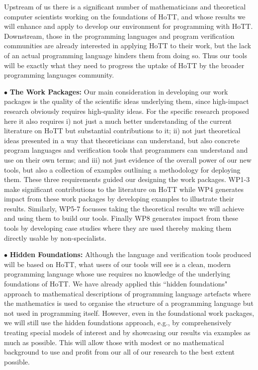 \documentclass[a4paper,11pt]{article}
\begin{document}
Upstream of us there is a significant number of mathematicians and
theoretical computer scientists working on the foundations of HoTT,
and whose results we will enhance and apply to develop our environment
for programming with HoTT. Downstream, those in the programming
languages and program verification communities are already interested
in applying HoTT to their work, but the lack of an actual programming
language hinders them from doing so. Thus our tools will be exactly
what they need to progress the uptake of HoTT by the broader
programming languages community. 

\vspace*{0.02in}

$\bullet$ {\bf The Work Packages:} Our main consideration in
developing our work packages is the quality of the scientific ideas
underlying them, since high-impact research obviously requires
high-quality ideas. For the specific research proposed here it also
requires i) not just a much better understanding of the current
literature on HoTT but substantial contributions to it; ii) not just
theoretical ideas presented in a way that theoreticians can
understand, but also concrete program languages and verification tools
that programmers can understand and use on their own terms; and iii)
not just evidence of the overall power of our new tools, but also a
collection of examples outlining a methodology for deploying them.
These three requirements guided our designing the work packages. WP1-3
make significant contributions to the literature on HoTT while WP4
generates impact from these work packages by developing examples to
illustrate their results. Similarly, WP5-7 focusses taking the
theoretical results we will achieve and using them to build our
tools. Finally WP8 generates impact from these tools by developing
case studies where they are used thereby making them
directly usable by non-specialists.  

\vspace*{0.02in}

$\bullet$ {\bf Hidden Foundations:} Although the language and
verification tools produced will be based on HoTT, what users of our
tools will see is a clean, modern programming language whose use
requires no knowledge of the underlying foundations of HoTT. We have
already applied this ``hidden foundations" approach to mathematical
descriptions of programming language artefacts where the mathematics
is used to organise the structure of a programming language but not
used in programming itself. However, even in the foundational work
packages, we will still use the hidden foundations approach, e.g., by
comprehensively treating special models of interest and by showcasing
our results via examples as much as possible. This will allow those
with modest or no mathematical background to use and profit from our
all of our research to the best extent possible.
\end{document}
